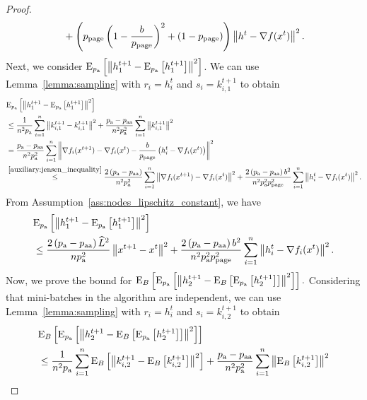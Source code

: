 \documentclass{article}
\newcommand*{\probavailable}{\ensuremath{p_{\textnormal{a}}}}
\newcommand*{\probpairaa}{\ensuremath{p_{\textnormal{aa}}}}
\newcommand*{\probpage}{\ensuremath{p_{\text{page}}}}
\begin{document}
\begin{proof}
\begin{align}
    &\quad +\left(\probpage\left(1 - \frac{b}{\probpage}\right)^2 + (1 - \probpage)\right)\norm{h^{t} - \nabla f(x^{t})}^2. \label{eq:page_proof:orig}
  \end{align}
  Next, we consider $\ExpSub{\probavailable}{\norm{h^{t+1}_{1} - \ExpSub{\probavailable}{h^{t+1}_{1}}}^2}$. We can use Lemma~\ref{lemma:sampling} with $r_i = h^{t}_i$ and $s_i = k^{t+1}_{i,1}$ to obtain
  \begin{align*}
    &\ExpSub{\probavailable}{\norm{h^{t+1}_{1} - \ExpSub{\probavailable}{h^{t+1}_{1}}}^2}\\
    &\leq \frac{1}{n^2 \probavailable}\sum_{i=1}^n\norm{k^{t+1}_{i,1} - k^{t+1}_{i,1}}^2 +\frac{\probavailable - \probpairaa}{n^2 \probavailable^2}\sum_{i=1}^n\norm{k^{t+1}_{i,1}}^2 \\
    &= \frac{\probavailable - \probpairaa}{n^2 \probavailable^2}\sum_{i=1}^n\norm{\nabla f_i(x^{t+1}) - \nabla f_i(x^{t}) - \frac{b}{\probpage} \left(h^t_i - \nabla f_i(x^{t})\right)}^2 \\
    &\overset{\eqref{auxiliary:jensen_inequality}}{\leq} \frac{2\left(\probavailable - \probpairaa\right)}{n^2 \probavailable^2}\sum_{i=1}^n\norm{\nabla f_i(x^{t+1}) - \nabla f_i(x^{t})}^2 + \frac{2 \left(\probavailable - \probpairaa\right) b^2}{n^2 \probavailable^2 \probpage^2}\sum_{i=1}^n\norm{h^t_i - \nabla f_i(x^{t})}^2.
  \end{align*}
  From Assumption~\ref{ass:nodes_lipschitz_constant}, we have
  \begin{align}
    &\ExpSub{\probavailable}{\norm{h^{t+1}_{1} - \ExpSub{\probavailable}{h^{t+1}_{1}}}^2} \nonumber\\
    &\leq \frac{2\left(\probavailable - \probpairaa\right) \widehat{L}^2}{n \probavailable^2}\norm{x^{t+1} - x^{t}}^2 + \frac{2 \left(\probavailable - \probpairaa\right)b^2}{n^2 \probavailable^2 \probpage^2}\sum_{i=1}^n\norm{h^t_i - \nabla f_i(x^{t})}^2 \label{eq:page_proof:h_1}.
  \end{align}
  Now, we prove the bound for $\ExpSub{B}{\ExpSub{\probavailable}{\norm{h^{t+1}_{2} - \ExpSub{B}{\ExpSub{\probavailable}{h^{t+1}_{2}}}}^2}}.$
  Considering that mini-batches in the algorithm are independent, we can use Lemma~\ref{lemma:sampling} with $r_i = h^{t}_i$ and $s_i = k^{t+1}_{i,2}$ to obtain
  \begin{align*}
    &\ExpSub{B}{\ExpSub{\probavailable}{\norm{h^{t+1}_{2} - \ExpSub{B}{\ExpSub{\probavailable}{h^{t+1}_{2}}}}^2}}\\
    &\leq \frac{1}{n^2 \probavailable}\sum_{i=1}^n\ExpSub{B}{\norm{k^{t+1}_{i,2} - \ExpSub{B}{k^{t+1}_{i,2}}}^2} +\frac{\probavailable - \probpairaa}{n^2 \probavailable^2}\sum_{i=1}^n\norm{\ExpSub{B}{k^{t+1}_{i,2}}}^2 \\

\end{align*}
\end{proof}
\end{document}
